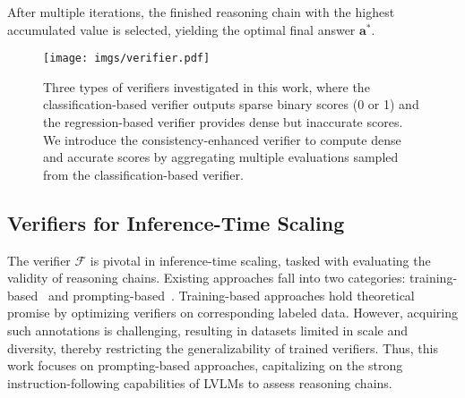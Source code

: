 After multiple iterations, the finished reasoning chain with the highest accumulated value is selected, yielding the optimal final answer \(\mathbf{a}^*\).   



\begin{figure}[htp]
  \texttt{[image: imgs/verifier.pdf]}
  \centering
  \caption{Three types of verifiers investigated in this work, where the classification-based verifier outputs sparse binary scores (0 or 1) and the regression-based verifier provides dense but inaccurate scores. We introduce the consistency-enhanced verifier to compute dense and accurate scores by aggregating multiple evaluations sampled from the classification-based verifier.}
  \label{fig:verifier}
\end{figure}


\subsection{Verifiers for Inference-Time Scaling} \label{verifier}

The verifier \(\mathcal{F}\) is pivotal in inference-time scaling, tasked with evaluating the validity of reasoning chains. 
Existing approaches fall into two categories: training-based~\cite{llava-critic, shepherd} and prompting-based~\cite{binary1, binary2, scoring1}.
Training-based approaches hold theoretical promise by optimizing verifiers on corresponding labeled data.
However, acquiring such annotations is challenging, resulting in datasets limited in scale and diversity, thereby restricting the generalizability of trained verifiers.
Thus, this work focuses on prompting-based approaches, capitalizing on the strong instruction-following capabilities of LVLMs to assess reasoning chains.  


